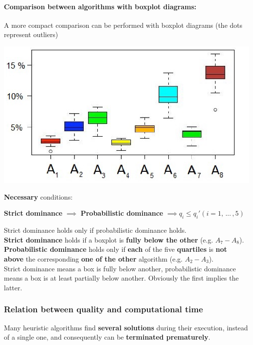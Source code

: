 \documentclass[11pt]{article}
\begin{document}
	\paragraph{Comparison between algorithms with boxplot diagrams:} A more compact comparison can be performed with boxplot diagrams (the dots represent outliers)
	\begin{center}
		\includegraphics[width=0.9\columnwidth]{img/boxplot2}
	\end{center}
	\textbf{Necessary} conditions:
	\begin{center}
		\textbf{Strict dominance} $\implies$ \textbf{Probabilistic dominance} $\implies q_i \leq q_i ' (i = 1, \, ... \, , 5)$
	\end{center}
	Strict dominance holds only if probabilistic dominance holds. \\
	
	\textbf{Strict dominance} holds if a boxplot is \textbf{fully below the other} (e.g. $A_7 - A_8$).\\
	
	\textbf{Probabilistic dominance} holds only if \textbf{each} of the five \textbf{quartiles} is \textbf{not above} the corresponding \textbf{one of the other} algorithm (e.g. $A_2 - A_3$).\\
	
	Strict dominance means a box is fully below another, probabilistic dominance means a box is at least partially below another. Obviously the first implies the latter.\\
	
	\newpage
	
	\subsubsection{Relation between quality and computational time}
	Many heuristic algorithms find \textbf{several solutions} during their execution, instead of a single one, and consequently can be \textbf{terminated prematurely}.\\
	
\end{document}
